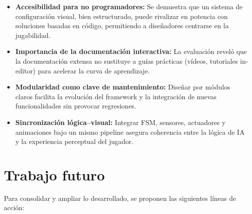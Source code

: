 \begin{itemize}
  \item \textbf{Accesibilidad para no programadores:} Se demuestra que un sistema de configuración visual, bien estructurado, puede rivalizar en potencia con soluciones basadas en código, permitiendo a diseñadores centrarse en la jugabilidad.  
  \item \textbf{Importancia de la documentación interactiva:} La evaluación reveló que la documentación extensa no sustituye a guías prácticas (vídeos, tutoriales in-editor) para acelerar la curva de aprendizaje.  
  \item \textbf{Modularidad como clave de mantenimiento:} Diseñar por módulos claros facilita la evolución del framework y la integración de nuevas funcionalidades sin provocar regresiones.  
  \item \textbf{Sincronización lógica–visual:} Integrar FSM, sensores, actuadores y animaciones bajo un mismo pipeline asegura coherencia entre la lógica de IA y la experiencia perceptual del jugador.
\end{itemize}

\section{Trabajo futuro}
Para consolidar y ampliar lo desarrollado, se proponen las siguientes líneas de acción:

